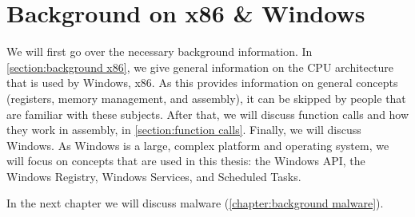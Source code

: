 \chapter{Background on x86 \& Windows}\label{chapter:background x86 windows}
We will first go over the necessary background information. In \autoref{section:background x86}, we give general information on the CPU architecture that is used by Windows, x86. As this provides information on general concepts (registers, memory management, and assembly), it can be skipped by people that are familiar with these subjects. After that, we will discuss function calls and how they work in assembly, in \autoref{section:function calls}. Finally, we will discuss Windows. As Windows is a large, complex platform and operating system, we will focus on concepts that are used in this thesis: the Windows API, the Windows Registry, Windows Services, and Scheduled Tasks.

In the next chapter we will discuss malware (\autoref{chapter:background malware}).




